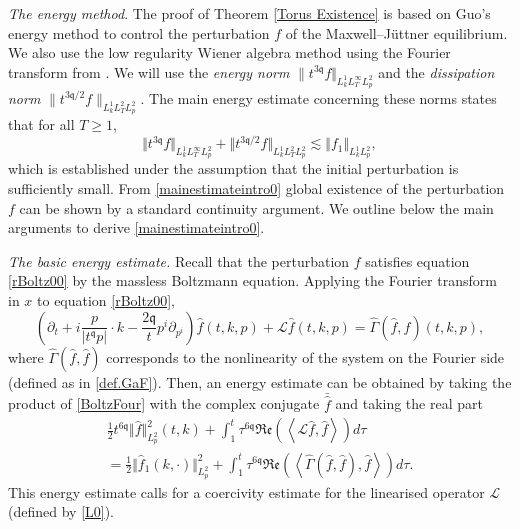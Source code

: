 \documentclass[reqno]{amsart}
\newcommand{\pv}{p}
\def\norm#1{\big\Vert#1\big\Vert}
\newcommand{\irnp}[2]{\left\langle {#1},{#2} \right\rangle}
\newcommand{\qq}{\mathfrak{q}}
\newcommand{\tq}{t^{\qq}}
\newcommand{\tTq}{t^{3\qq}}
\newcommand{\tQQq}{t^{6\qq}}
\newcommand{\linL}{\mathcal{L}}
\newcommand{\real}[1]{\mathfrak{Re}\left(#1\right)}
\theoremstyle{definition}
\numberwithin{equation}{section}
\numberwithin{theorem}{section}
\begin{document}
\textit{The energy method}. The proof of Theorem \ref{Torus Existence} is based on Guo's energy method \cite{Guo-VMB} to control the perturbation \(f\) of the Maxwell--J\"uttner equilibrium.  We also use the low regularity Wiener algebra method using the Fourier transform from \cite{1904.12086}.  We will use the \emph{energy norm} \(\|\tTq f\Vert_{L^1_kL^\infty_TL^2_{\pv}}\) and the \emph{dissipation norm} \(\|t^{3\qq/2} f\|_{L^1_kL^2_TL^2_{\pv}}\). The main energy estimate concerning these norms states that for all \(T\geq 1\),
\begin{equation}\label{mainestimateintro0}
        {\Vert{\tTq f}\Vert_{L^1_kL^\infty_TL^2_{\pv}}}
+
{\norm{t^{3\qq/2} f}_{L^1_kL^2_TL^2_{\pv}}}
\lesssim 
\norm{ {f}_1}_{L^1_kL^2_{\pv}}
,
\end{equation}
which is established under the assumption that the initial perturbation is sufficiently small. From \eqref{mainestimateintro0} global existence of the perturbation \(f\) can be shown by a standard continuity argument. We outline below the main arguments to derive \eqref{mainestimateintro0}.



\textit{The basic energy estimate.} Recall that the perturbation \(f\) satisfies equation \eqref{rBoltz00} by the massless Boltzmann equation. Applying the Fourier transform in \(x\) to equation \eqref{rBoltz00},
\begin{equation}\label{BoltzFour}
\left(\partial_t  + i\frac{\pv}{|\tq \pv|}\cdot k 
-\frac{2\qq }{t} p^i \partial_{p^i} \right) \hat{f}(t,k,\pv)
+\linL\hat{f}(t,k,\pv)=\widehat{\Gamma}(\hat{f},\hat{f})(t,k,\pv),
\end{equation}
where $\widehat{\Gamma}(\hat{f},\hat{f})$ corresponds to the nonlinearity of the system on the Fourier side (defined as in \eqref{def.GaF}). Then, an energy estimate can be obtained by taking the product of \eqref{BoltzFour} with the complex conjugate \(\bar{\hat{f}}\) and taking the real part
\begin{multline}\label{pro.tpm.p10}
\frac{1}{2} \tQQq \Vert \hat{f}\Vert_{L^2_{\pv}}^2(t,k)+\int^t_1  \tau^{6\qq}\real{\irnp{\linL\hat{f}}{\hat{f}}}d\tau
\\
=\frac{1}{2}\Vert \hat{f}_1(k,\cdot)\Vert_{L^2_{\pv}}^2
+
\int^t_1 \tau^{6\qq}\real{\irnp{\hat{\Gamma}(\hat{f},\hat{f})}{\hat{f}}}
d\tau.
\end{multline}
This energy estimate calls for a coercivity estimate for the linearised operator \(\mathcal{L}\) (defined by \eqref{L0}). 
\end{document}
